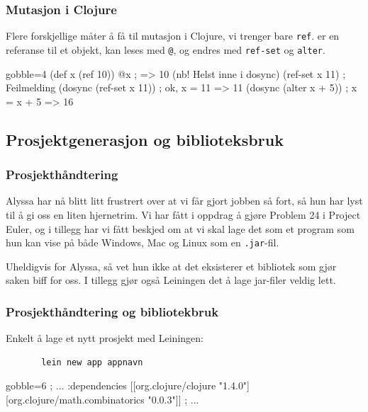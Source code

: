 \documentclass{beamer}
\begin{document}
\begin{frame}[fragile]
  \frametitle{Mutasjon i Clojure}

  Flere forskjellige måter å få til mutasjon i Clojure, vi trenger bare
  {\tt ref}.
   er en referanse til et objekt, kan leses med {\tt @}, og
  endres med {\tt ref-set} og {\tt alter}.
  \vspace{3mm}
  \begin{cljcode*}{gobble=4}
    (def x (ref 10))
    @x ; => 10 (nb! Helst inne i dosync)
    (ref-set x 11) ; Feilmelding
    (dosync (ref-set x 11)) ; ok, x = 11 => 11
    (dosync (alter x + 5)) ; x = x + 5 => 16
  \end{cljcode*}

  \vspace{3mm}
\end{frame}

\subsection{Prosjektgenerasjon og biblioteksbruk}
\begin{frame}
  \frametitle{Prosjekthåndtering}

  Alyssa har nå blitt litt frustrert over at vi får gjort jobben så fort, så hun
  har lyst til å gi oss en liten hjernetrim. Vi har fått i oppdrag å gjøre
  Problem 24 i Project Euler, og i tillegg har vi fått beskjed om at vi skal
  lage det som et program som hun kan vise på både Windows, Mac og Linux som en
  {\tt .jar}-fil.

  \vspace{3mm}
  \pause
  Uheldigvis for Alyssa, så vet hun ikke at det eksisterer et bibliotek som gjør
  saken biff for oss. I tillegg gjør også Leiningen det å lage jar-filer veldig
  lett.
\end{frame}

\begin{frame}[fragile]
  \frametitle{Prosjekthåndtering og bibliotekbruk}

  Enkelt å lage et nytt prosjekt med Leiningen:
   \begin{overprint}
     \begin{verbatim}
       lein new app appnavn
     \end{verbatim}
   \end{overprint}
   \vspace{3mm}


   \begin{overprint}
     \begin{cljcode*}{gobble=6}
       ; ...
       :dependencies [[org.clojure/clojure "1.4.0"]
                [org.clojure/math.combinatorics "0.0.3"]]
       ; ...
     \end{cljcode*}
   \end{overprint}
   \vspace{3mm}
\end{frame}
\end{document}
